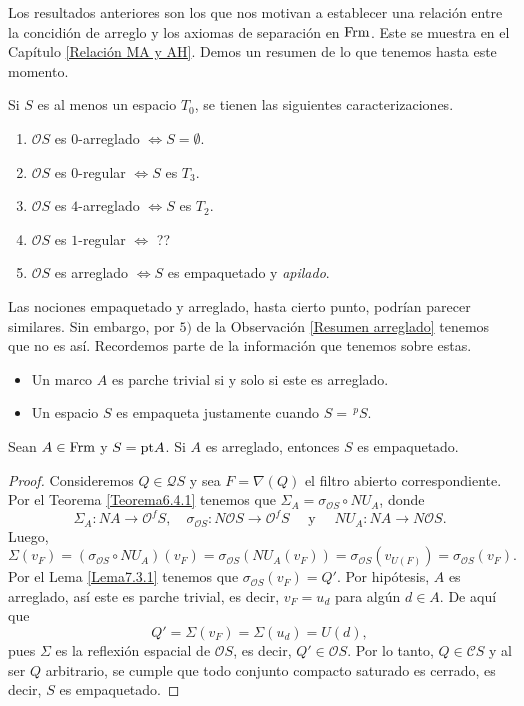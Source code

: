 Los resultados anteriores son los que nos motivan a establecer una relación entre la concidión de arreglo y los axiomas de separación en $\mathrm{Frm}$. Este se muestra en el Capítulo \ref{Relación MA y AH}. Demos un resumen de lo que tenemos hasta este momento.
\begin{obs}\label{Resumen arreglado}
Si $S$ es al menos un espacio $T_0$, se tienen las siguientes caracterizaciones.
\begin{enumerate}
    \item $\mathcal{O}S$ es $0$-arreglado $\Leftrightarrow S=\emptyset$.
    \item $\mathcal{O}S$ es $0$-regular $\Leftrightarrow S$ es $T_3$.
    \item $\mathcal{O}S$ es $4$-arreglado $\Leftrightarrow S$ es $T_2$.
    \item $\mathcal{O}S$ es $1$-regular $\Leftrightarrow$ ??
    \item $\mathcal{O}S$ es arreglado $\Leftrightarrow S$ es empaquetado y \emph{apilado}. 
\end{enumerate}
\end{obs}

Las nociones empaquetado y arreglado, hasta cierto punto, podrían parecer similares. Sin embargo, por $5)$ de la Observación \ref{Resumen arreglado} tenemos que no es así. Recordemos parte de la información que tenemos sobre estas.

\begin{itemize}
    \item Un marco $A$ es parche trivial si y solo si este es arreglado. 

    \item Un espacio $S$ es empaqueta justamente cuando $S=\,^pS$.
\end{itemize}

\begin{lem}\label{Lema8.5.1}
    Sean $A\in \mathrm{Frm}$ y $S=\mathrm{pt} A$. Si $A$ es arreglado, entonces $S$ es empaquetado.
\end{lem}

\begin{proof}
    Consideremos $Q\in\mathcal{Q}S$ y sea $F=\nabla(Q)$ el filtro abierto correspondiente. Por el Teorema \ref{Teorema6.4.1} tenemos que $\Sigma_A=\sigma_{\mathcal{O}S}\circ NU_A$, donde 
    \[
    \Sigma_A\colon NA\to \mathcal{O}^fS,\quad\sigma_{\mathcal{O}S}\colon N\mathcal{O}S\to \mathcal{O}^fS\quad\mbox{ y }\quad NU_A\colon NA\to N\mathcal{O}S.
    \]
    Luego,
    \[
    \Sigma(v_F)=(\sigma_{\mathcal{O}S}\circ NU_A)(v_F)=\sigma_{\mathcal{O}S}(NU_A(v_F))=\sigma_{\mathcal{O}S}(v_{U(F)})=\sigma_{\mathcal{O}S}(v_F).
    \]
    Por el Lema \ref{Lema7.3.1} tenemos que $\sigma_{\mathcal{O}S}(v_F)=Q'$. Por hipótesis, $A$ es arreglado, así este es parche trivial, es decir, $v_F=u_d$ para algún $d\in A$. De aquí que
    \[
    Q'=\Sigma(v_F)=\Sigma(u_d)=U(d),
    \]
    pues $\Sigma$ es la reflexión espacial de $\mathcal{O}S$, es decir, $Q'\in \mathcal{O}S$. Por lo tanto, $Q\in \mathcal{C}S$ y al ser $Q$ arbitrario, se cumple que todo conjunto compacto saturado es cerrado, es decir, $S$ es empaquetado.
\end{proof}

